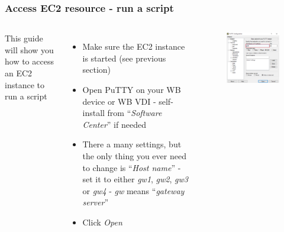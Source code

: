 \documentclass[aspectratio=169]{beamer} %
\begin{document}
\begin{frame}
	\frametitle{Access EC2 resource - run a script}
	\begin{columns}[c]
		This guide will show you how to access an EC2 instance to run a script
		\begin{itemize}
			\item Make sure the EC2 instance is started (see previous section)
			\item Open PuTTY on your WB device or WB VDI
			- self-install from ``\textit{Software Center}'' if needed
			\item There a many settings,
			but the only thing you ever need to change is ``\textit{Host name}''
			- set it to either \textit{gw1}, \textit{gw2}, \textit{gw3} or \textit{gw4}
			- \textit{gw} means ``\textit{gateway server}''
			\item Click \textit{Open}
		\end{itemize}

		\begin{figure}
			\centering
			\includegraphics[width=\textwidth]{./img/access-1.png}
		\end{figure}

	\end{columns}
\end{frame}
\end{document}

